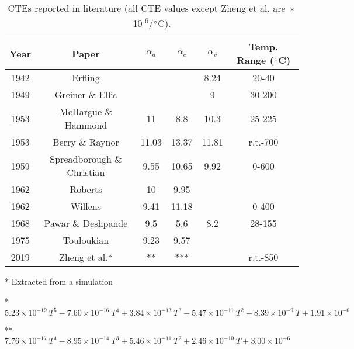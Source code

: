 \documentclass[3p]{elsarticle}
\begin{document}
	
\begin{table}[b!]
	\centering
	\begin{tabular}{c|c|c|c|c|c}
		\textbf{Year} & \textbf{Paper} & \textbf{$\alpha_a$}  & \textbf{$\alpha_c$} & \textbf{$\alpha_v$} & \textbf{Temp. Range ($\degree$C)} \\ \hline
		
		\hline
		1942 & Erfling \cite{Erfling1942} &  &  & 8.24 & 20-40 \\ 
		\hline
		1949 & Greiner \& Ellis \cite{Greiner1949} &   &  & 9 & 30-200 \\ 
		\hline
		1953 & McHargue \& Hammond \cite{Mchargue1953}& 11 & 8.8 & 10.3 & 25-225\\ 
		\hline
		1953 & Berry \& Raynor \cite{Berry1953}& 11.03 & 13.37 & 11.81 & r.t.-700\\ 
		\hline
		1959 & Spreadborough \& Christian \cite{Spreadborough1959} & 9.55 & 10.65 & 9.92 & 0-600 \\ 
		\hline
		1962 & Roberts \cite{Roberts1962} & 10 & 9.95 &  & \\ 
		\hline
		1962 & Willens \cite{Willens1962}& 9.41 & 11.18 &  & 0-400 \\ 
		\hline
		1968 & Pawar \& Deshpande \cite{Pawar1968}& 9.5 & 5.6 & 8.2 & 28-155\\ 
		\hline
		1975 & Touloukian \cite{Touloukian1975}& 9.23 & 9.57 &  & \\ 
		\hline
		2019 & Zheng et al.* \cite{Zheng2019}& ** & *** &  & r.t.-850\\ 
	\end{tabular}
	\justifying
	
	\noindent\** Extracted from a simulation \par
	\noindent** $5.23\times10^{-19}~T^5 - 7.60\times10^{-16}~T^4 + 3.84\times10^{-13}~T^3 - 5.47\times10^{-11}~T^2 +8.39\times10^{-9}~T + 1.91\times10^{-6}$ \par
	\noindent*** $7.76\times10^{-17}~T^4 - 8.95\times10^{-14}~T^3 + 5.46\times10^{-11}~T^2 + 2.46\times10^{-10}~T + 3.00\times10^{-6} $
	\caption{CTEs reported in literature (all CTE values except Zheng et al. are $\times$10\textsuperscript{-6}/$\degree$C).}
	\label{tab:Ti_CTE}
\end{table}
	
	
	
\end{document}
